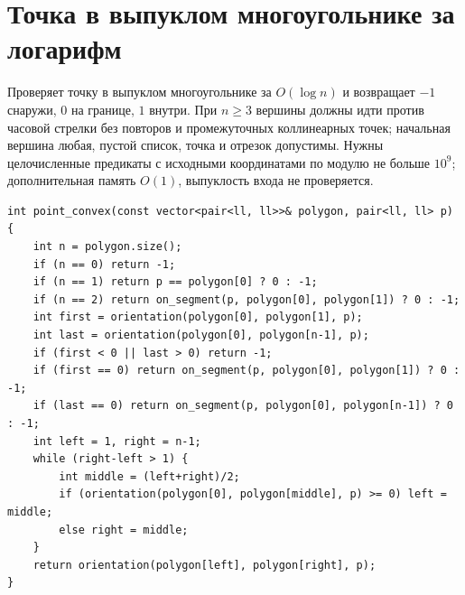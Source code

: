 \section{Точка в выпуклом многоугольнике за логарифм}
Проверяет точку в выпуклом многоугольнике за $O(\log n)$ и возвращает $-1$ снаружи, $0$ на границе, $1$ внутри.
При $n\ge3$ вершины должны идти против часовой стрелки без повторов и промежуточных коллинеарных точек; начальная вершина любая, пустой список, точка и отрезок допустимы.
Нужны целочисленные предикаты с исходными координатами по модулю не больше $10^9$; дополнительная память $O(1)$, выпуклость входа не проверяется.
\begin{lstlisting}[name=geometry_point_convex]
int point_convex(const vector<pair<ll, ll>>& polygon, pair<ll, ll> p) {
    int n = polygon.size();
    if (n == 0) return -1;
    if (n == 1) return p == polygon[0] ? 0 : -1;
    if (n == 2) return on_segment(p, polygon[0], polygon[1]) ? 0 : -1;
    int first = orientation(polygon[0], polygon[1], p);
    int last = orientation(polygon[0], polygon[n-1], p);
    if (first < 0 || last > 0) return -1;
    if (first == 0) return on_segment(p, polygon[0], polygon[1]) ? 0 : -1;
    if (last == 0) return on_segment(p, polygon[0], polygon[n-1]) ? 0 : -1;
    int left = 1, right = n-1;
    while (right-left > 1) {
        int middle = (left+right)/2;
        if (orientation(polygon[0], polygon[middle], p) >= 0) left = middle;
        else right = middle;
    }
    return orientation(polygon[left], polygon[right], p);
}
\end{lstlisting}
%

\iffalse
